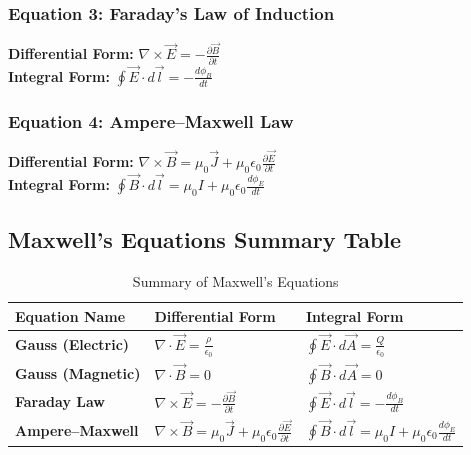 \documentclass[11pt,a4paper]{article}
\begin{document}
\subsubsection{Equation 3: Faraday's Law of Induction}
\begin{formulabox}
    \textbf{Differential Form:} $\nabla \times \vec{E} = -\frac{\partial\vec{B}}{\partial t}$ \\[0.1cm]
    \textbf{Integral Form:} $\oint \vec{E} \cdot d\vec{l} = -\frac{d\phi_B}{dt}$
\end{formulabox}

\subsubsection{Equation 4: Ampere--Maxwell Law}
\begin{formulabox}
    \textbf{Differential Form:} $\nabla \times \vec{B} = \mu_0 \vec{J} + \mu_0\epsilon_0\frac{\partial\vec{E}}{\partial t}$ \\[0.1cm]
    \textbf{Integral Form:} $\oint \vec{B} \cdot d\vec{l} = \mu_0 I + \mu_0\epsilon_0\frac{d\phi_E}{dt}$
\end{formulabox}

\subsection{Maxwell's Equations Summary Table}
\begin{table}[htbp]
    \centering
    \caption{Summary of Maxwell's Equations}
    \vspace{0.2cm}
    \begin{tabular}{lll}
        \toprule
        \textbf{Equation Name} & \textbf{Differential Form} & \textbf{Integral Form} \\
        \midrule
        \textbf{Gauss (Electric)} & $\nabla \cdot \vec{E} = \frac{\rho}{\epsilon_0}$ & $\oint \vec{E} \cdot d\vec{A} = \frac{Q}{\epsilon_0}$ \\
        \textbf{Gauss (Magnetic)} & $\nabla \cdot \vec{B} = 0$ & $\oint \vec{B} \cdot d\vec{A} = 0$ \\
        \textbf{Faraday Law} & $\nabla \times \vec{E} = -\frac{\partial\vec{B}}{\partial t}$ & $\oint \vec{E} \cdot d\vec{l} = -\frac{d\phi_B}{dt}$ \\
        \textbf{Ampere--Maxwell} & $\nabla \times \vec{B} = \mu_0 \vec{J} + \mu_0\epsilon_0\frac{\partial\vec{E}}{\partial t}$ & $\oint \vec{B} \cdot d\vec{l} = \mu_0 I + \mu_0\epsilon_0\frac{d\phi_E}{dt}$ \\
        \bottomrule
    \end{tabular}
\end{table}
\end{document}
